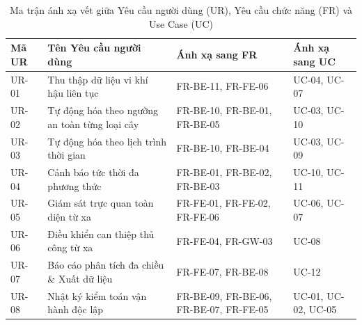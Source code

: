 \begin{table}[H]
\centering
\small
\begin{tabularx}{\textwidth}{|l|X|l|l|}
\hline
\textbf{Mã UR} & \textbf{Tên Yêu cầu người dùng} & \textbf{Ánh xạ sang FR} & \textbf{Ánh xạ sang UC} \\ \hline
UR-01 & Thu thập dữ liệu vi khí hậu liên tục & FR-BE-11, FR-FE-06 & UC-04, UC-07 \\ \hline
UR-02 & Tự động hóa theo ngưỡng an toàn từng loại cây & FR-BE-10, FR-BE-01, FR-BE-05 & UC-03, UC-10 \\ \hline
UR-03 & Tự động hóa theo lịch trình thời gian & FR-BE-10, FR-BE-04 & UC-03, UC-09 \\ \hline
UR-04 & Cảnh báo tức thời đa phương thức & FR-BE-01, FR-BE-02, FR-BE-03 & UC-10, UC-11 \\ \hline
UR-05 & Giám sát trực quan toàn diện từ xa & FR-FE-01, FR-FE-02, FR-FE-06 & UC-06, UC-07 \\ \hline
UR-06 & Điều khiển can thiệp thủ công từ xa & FR-FE-04, FR-GW-03 & UC-08 \\ \hline
UR-07 & Báo cáo phân tích đa chiều \& Xuất dữ liệu & FR-FE-07, FR-BE-08 & UC-12 \\ \hline
UR-08 & Nhật ký kiểm toán vận hành độc lập & FR-BE-09, FR-BE-06, FR-BE-07, FR-FE-05 & UC-01, UC-02, UC-05 \\ \hline
\end{tabularx}
\caption{Ma trận ánh xạ vết giữa Yêu cầu người dùng (UR), Yêu cầu chức năng (FR) và Use Case (UC)}
\label{tab:ur_fr_mapping}
\end{table}
